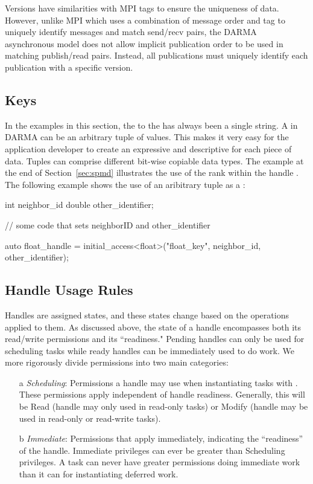 Versions have similarities with MPI tags to ensure the uniqueness of data.
However, unlike MPI which uses a combination of message order and tag to uniquely identify messages and match send/recv pairs,
the DARMA asynchronous model does not allow implicit publication order to be used in matching publish/read pairs.
Instead, all publications must uniquely identify each publication with a specific version.


\subsection{Keys}
\label{subsec:keys}
In the examples in this section, the  to the
\ahandleT has always been a single string. 
A  in DARMA 
can be an arbitrary \gls{tuple} of values.  This 
makes it very easy for the application developer to create an expressive
and descriptive  for each piece of data.  Tuples can comprise
different bit-wise copiable data types.  The example at the end of
Section~\ref{sec:spmd} illustrates the use of the \gls{rank} within the handle
.  The following example shows the use of an
aribitrary \gls{tuple} as a :
\begin{CppCode}
  int neighbor_id
  double other_identifier;

  // some code that sets neighborID and other_identifier
  
  auto float_handle = initial_access<float>("float_key", 
                                            neighbor_id, 
                                            other_identifier);
\end{CppCode}

\subsection{Handle Usage Rules}
\label{sec:handlerules}
Handles are assigned states, and these states change 
based on the operations applied to them.  
As discussed above, the state of a handle encompasses both its read/write permissions and its ``readiness."
Pending handles can only be used for scheduling tasks while ready handles can be immediately used to do work.
We more rigorously divide permissions into two main categories: 
\begin{itemize}
\item[a] {\it Scheduling}: Permissions a handle may use when instantiating tasks with .
These permissions apply independent of handle readiness. 
Generally, this will be Read (handle may only used in read-only tasks) or Modify (handle may be used in read-only or read-write tasks). 
\item[b] {\it Immediate}: Permissions that apply immediately, indicating the ``readiness'' of the handle.  Immediate privileges can ever be greater than Scheduling privileges.
A task can never have greater permissions doing immediate work than it can for instantiating deferred work.
\end{itemize}


